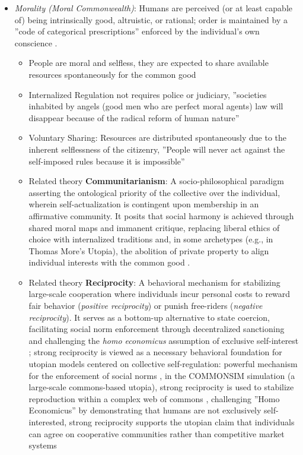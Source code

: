 \documentclass[jou,floatsintext]{apa7}
\begin{document}
\begin{itemize}
\begin{itemize}
    \item \textit{Morality (Moral Commonwealth)}: Humans are perceived (or at least capable of) being intrinsically good, altruistic, or rational; order is maintained by a ''code of categorical prescriptions'' enforced by the individual's own conscience \parencite{aviles14LawBasedUtopia2001, fernandoGreensSpaceInvaders2020}.
    \begin{itemize}
        \item People are moral and selfless, they are expected to share available resources spontaneously for the common good \parencite{aviles14LawBasedUtopia2001}
        \item Internalized Regulation not requires police or judiciary, ''societies inhabited by angels (good men who are perfect moral agents) law will disappear because of the radical reform of human nature'' \parencite{aviles14LawBasedUtopia2001}
        \item Voluntary Sharing: Resources are distributed spontaneously due to the inherent selflessness of the citizenry, ''People will never act against the self-imposed rules because it is impossible'' \parencite{aviles14LawBasedUtopia2001}
        \item[$\rightarrow$] Related theory \textbf{Communitarianism}: A socio-philosophical paradigm asserting the ontological priority of the collective over the individual, wherein self-actualization is contingent upon membership in an affirmative community. It posits that social harmony is achieved through shared moral maps and immanent critique, replacing liberal ethics of choice with internalized traditions and, in some archetypes (e.g., in Thomas More’s Utopia), the abolition of private property to align individual interests with the common good \parencite{uysalRevisitingCommunitarianismNeither2025, vandenheuvalLiberalismCommunitarianismSearch2006}.
        \item[$\rightarrow$] Related theory \textbf{Reciprocity}: A behavioral mechanism for stabilizing large-scale cooperation where individuals incur personal costs to reward fair behavior (\textit{positive reciprocity}) or punish free-riders (\textit{negative reciprocity}). It serves as a bottom-up alternative to state coercion, facilitating social norm enforcement through decentralized sanctioning and challenging the \textit{homo economicus} assumption of exclusive self-interest \parencite{dubreuilStrongReciprocityEmergence2008, fehrStrongReciprocityHuman2002}; strong reciprocity is viewed as a necessary behavioral foundation for utopian models centered on collective self-regulation: powerful mechanism for the enforcement of social norms \parencite{fehrStrongReciprocityHuman2002}, in the COMMONSIM simulation (a large-scale commons-based utopia), strong reciprocity is used to stabilize reproduction within a complex web of commons \parencite{gerdesCOMMONSIMSimulatingUtopia2023}, challenging ''Homo Economicus'' by demonstrating that humans are not exclusively self-interested, strong reciprocity supports the utopian claim that individuals can agree on cooperative communities rather than competitive market systems \parencite{fehrStrongReciprocityHuman2002, gerdesCOMMONSIMSimulatingUtopia2023, vandenheuvalLiberalismCommunitarianismSearch2006} 

\end{itemize}
\end{itemize}
\end{itemize}
\end{document}
